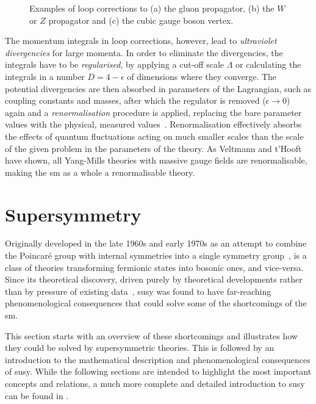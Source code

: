 \begin{figure}
\begin{subfigure}[b]{0.33\linewidth}
		\caption{\label{fig:cubic_vertex}}
	\end{subfigure}
	\caption{Examples of loop corrections to (a) the gluon propagator, (b) the $W$ or $Z$ propagator and (c) the cubic gauge boson vertex.}\label{fig:loop_corrections}
\end{figure}

The momentum integrals in loop corrections, however, lead to \textit{ultraviolet divergencies} for large momenta. In order to eliminate the divergencies, the integrals have to be \textit{regularised}, \eg by applying a cut-off scale $\Lambda$ or calculating the integrals in a number $D = 4-\epsilon$ of dimensions where they converge. The potential divergencies are then absorbed in parameters of the Lagrangian, such as coupling constants and masses, after which the regulator is removed (\eg $\epsilon\rightarrow 0$) again and a \textit{renormalisation} procedure is applied, replacing the bare parameter values with the physical, measured values~\cite{Brock:1354959}. Renormalisation effectively absorbs the effects of quantum fluctuations acting on much smaller scales than the scale of the given problem in the parameters of the theory.
As Veltmann and t'Hooft~\cite{THOOFT1972189,THOOFT1971173} have shown, all Yang-Mills theories with massive gauge fields are renormalisable, making the \gls{sm} as a whole a renormalisable theory.  

\section{Supersymmetry}

Originally developed in the late 1960s and early 1970s as an attempt to combine the Poincaré group with internal symmetries into a single symmetry group~\cite{kane2000the},  is a class of theories transforming fermionic states into bosonic ones, and vice-versa. Since its theoretical discovery, driven purely by theoretical developments rather than by pressure of existing data~\cite{kane2000the}, \gls{susy} was found to have far-reaching phenomenological consequences that could solve some of the shortcomings of the \gls{sm}. 

This section starts with an overview of these shortcomings and illustrates how they could be solved by supersymmetric theories. This is followed by an introduction to the mathematical description and phenomenological consequences of \gls{susy}. While the following sections are intended to highlight the most important concepts and relations, a much more complete and detailed introduction to \gls{susy} can be found in \cite{Martin:1997ns,Bustamante:2009us}.

